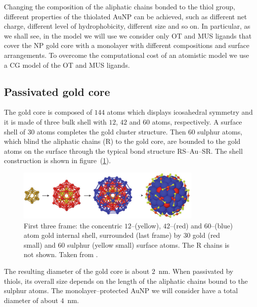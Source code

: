 Changing the composition of the aliphatic chains bonded to the thiol group, different properties of the thiolated \ac{AuNP} can be achieved, such as different net charge, different level of hydrophobicity, different size and so on. In particular, as we shall see, in the model we will use we consider only \ac{OT} and \ac{MUS} ligands that cover the \ac{NP} gold core with a monolayer with different compositions and surface arrangements. To overcome the computational cost of an atomistic model we use a \martini \ac{CG} model of the \ac{OT} and \ac{MUS} ligands. 


\subsection{Passivated gold core}
The gold core is composed of $144$ atoms which displays icosahedral symmetry and it is made of three bulk shell with $12$, $42$ and $60$ atoms, respectively. A surface shell of $30$ atoms completes the gold cluster structure. Then $60$ sulphur atoms, which blind the aliphatic chains (R) to the gold core, are bounded to the gold atoms on the surface through the typical bond structure RS--Au--SR. The shell construction is shown in figure~(\ref{fig:goldShell}).
\begin{figure}[!ht]
	\centering
	\includegraphics[width=0.8\textwidth]{./img/goldShell}
	\caption{First three frame: the concentric $12$--(yellow), $42$--(red) and $60$--(blue) atom gold internal shell, surrounded (last frame) by $30$ gold (red small) and $60$ sulphur (yellow small) surface atoms. The R chains is not shown. Taken from \cite{corePassivated}.}
	\label{fig:goldShell}
\end{figure}

The resulting diameter of the gold core is about $2$~nm. When passivated by thiols, its overall size depends on the length of the aliphatic chains bound to the sulphur atoms. The monolayer--protected \ac{AuNP} we will consider have a total diameter of about $4$~nm.

